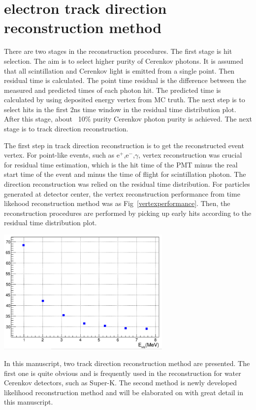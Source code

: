 \documentclass[a4paper,10pt]{cpc-hepnp}
\begin{document}
\section{electron track direction reconstruction method}
There are two stages in the reconstruction procedures. The first stage is hit
selection. The aim is to select higher purity of Cerenkov photons. It is
assumed that all scintillation and Cerenkov light is emitted from a single
point. Then residual time is calculated. The point time residual is the
difference between the measured and predicted times of each photon hit.
The predicted time is calculated by using deposited energy vertex from MC truth.
The next step
is to select hits in the first 2ns time window in the residual time
distribution plot. After this stage, about ~10\% purity Cerenkov photon purity
is achieved. The next stage is to track direction reconstruction. 

The first step in track direction reconstruction is to get the reconstructed event vertex.
For point-like events, such as e$^+$,e$^-$,$\gamma$, vertex reconstruction was crucial for 
residual time estimation, which is the hit time of the PMT minus the real start time of the event and minus the time of flight for
scintillation photon. The direction reconstruction was relied on the residual time distribution.
For particles generated at detector center, the vertex reconstruction performance from time likehood reconstruction method
was as Fig~\ref{vertexperformance}.
Then, the reconstruction procedures are performed by picking up early hits according to the residual time distribution plot.
\begin{center}
\includegraphics[width=8.5cm]{plots/vertexper}
\end{center}

In this manuscript, two track direction reconstruction method are presented.
The first one is quite obvious and is frequently used in the reconstruction for
water Cerenkov detectors, such as Super-K.
The second method is newly developed likelihood reconstruction method and will
be
elaborated on with great detail in this manuscript.
\end{document}
